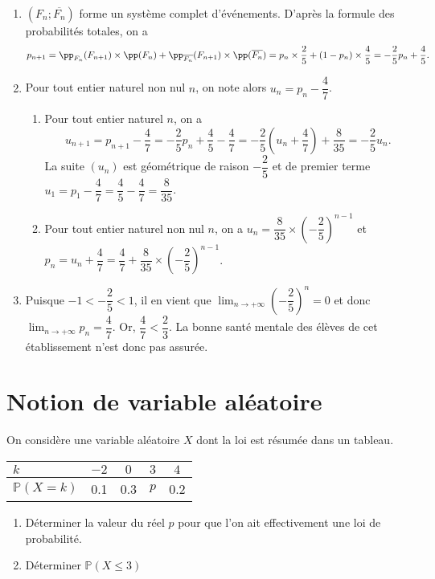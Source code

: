 \documentclass[11pt,fleqn, openany]{book} %
\begin{document}
\begin{solution}
\begin{enumerate}
    \item $(F_n ; \overline{F_n})$ forme un système complet d'événements. D'après la formule des probabilités totales, on a
    \[p_{n+1}=\pp_{F_n}(F_{n+1}) \times \pp(F_n)+\pp_{\overline{F_n}}(F_{n+1}) \times \pp(\overline{F_n})=p_n \times \dfrac{2}{5}+(1-p_n) \times \dfrac{4}{5}=-\dfrac{2}{5}p_n+\dfrac{4}{5}.\]
    \item Pour tout entier naturel non nul $n$, on note alors $u_n=p_n-\dfrac{4}{7}$.
    \begin{enumerate}
        \item Pour tout entier naturel $n$, on a
        \[u_{n+1}=p_{n+1}-\dfrac{4}{7}=-\dfrac{2}{5}p_n+\dfrac{4}{5}-\dfrac{4}{7}=-\dfrac{2}{5}\left(u_n+\dfrac{4}{7}\right)+\dfrac{8}{35}=-\dfrac{2}{5}u_n.\]
        La suite $(u_n)$ est géométrique de raison $-\dfrac{2}{5}$ et de premier terme $u_1=p_1-\dfrac{4}{7}=\dfrac{4}{5}-\dfrac{4}{7}=\dfrac{8}{35}$.
        \item Pour tout entier naturel non nul $n$, on a $u_n = \dfrac{8}{35}\times \left(-\dfrac{2}{5}\right)^{n-1}$ et $p_n=u_n+\dfrac{4}{7}=\dfrac{4}{7}+\dfrac{8}{35} \times \left(-\dfrac{2}{5}\right)^{n-1}$.
    \end{enumerate}
    \item Puisque $-1<-\dfrac{2}{5}<1$, il en vient que $\displaystyle\lim_{n \to +\infty}\left(-\dfrac{2}{5}\right)^n=0$ et donc $\displaystyle\lim_{n \to + \infty}p_n=\dfrac{4}{7}$. Or, $\dfrac{4}{7}<\dfrac{2}{3}$. La bonne santé mentale des élèves de cet établissement n'est donc pas assurée.
\end{enumerate}

\end{solution}




\section*{Notion de variable aléatoire}


\begin{exercise}[topic=prob02]On considère une variable aléatoire $X$ dont la loi est résumée dans un tableau.

\begin{center}
\begin{tabular}{|l|c|c|c|c|}
\hline
$k$ & $-2$ & $0$ & $3$ & $4$ \\
\hline
$\mathbb{P}(X=k)$ & 0.1 & 0.3 & $p$ & 0.2 \\
\hline \end{tabular}
\end{center}

\begin{enumerate}
\item Déterminer la valeur du réel $p$ pour que l'on ait effectivement une loi de probabilité.
\item Déterminer $\mathbb{P}(X \leqslant 3)$
\end{enumerate}\end{exercise}
\end{document}
